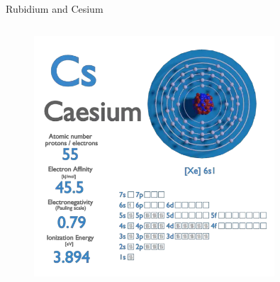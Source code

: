 \begin{frame}{Rubidium and Cesium}
\begin{columns}[c, onlytextwidth]
\begin{column}{0.5\textwidth}
            \begin{figure}
                \centering
                \includegraphics[width=0.8\textwidth]{img/Caesium.png}
            \end{figure}

        \end{column}

    \end{columns}

\end{frame}



